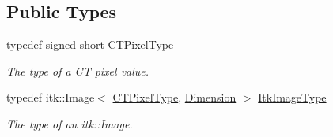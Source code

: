 \subsection*{Public Types}
\begin{DoxyCompactItemize}
\item 
\hypertarget{classctimage_1_1_c_t_image_ab3bf32a276d168a705973d8d6c698cec}{
typedef signed short \hyperlink{classctimage_1_1_c_t_image_ab3bf32a276d168a705973d8d6c698cec}{CTPixelType}}
\label{classctimage_1_1_c_t_image_ab3bf32a276d168a705973d8d6c698cec}

\begin{DoxyCompactList}\small\item\em The type of a CT pixel value. \item\end{DoxyCompactList}\item 
\hypertarget{classctimage_1_1_c_t_image_a6e3fc439772d8f22861508d9a7e3e694}{
typedef itk::Image$<$ \hyperlink{classctimage_1_1_c_t_image_ab3bf32a276d168a705973d8d6c698cec}{CTPixelType}, \hyperlink{classctimage_1_1_c_t_image_ad28aaad081539a4a2e7f1cc38c06aa3a}{Dimension} $>$ \hyperlink{classctimage_1_1_c_t_image_a6e3fc439772d8f22861508d9a7e3e694}{ItkImageType}}
\label{classctimage_1_1_c_t_image_a6e3fc439772d8f22861508d9a7e3e694}

\begin{DoxyCompactList}\small\item\em The type of an itk::Image. \item\end{DoxyCompactList}\end{DoxyCompactItemize}
